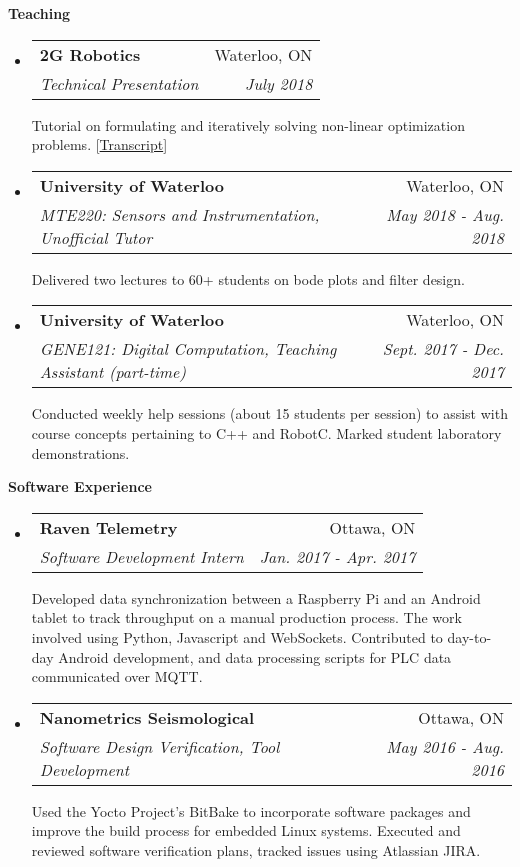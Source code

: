 \documentclass[letterpaper,11pt]{article}
\makeatletter
\newcommand{\resheading}[1]{{\large \colorbox{mygrey}{\begin{minipage}{\textwidth}{\textbf{#1 \vphantom{p\^{E}}}}\end{minipage}}}}
\newcommand{\ressubheading}[4]{
\begin{tabular*}{7.0in}{l@{\extracolsep{\fill}}r}
		\textbf{#1} & #2 \\
		\textit{#3} & \textit{#4} \\
\end{tabular*}\vspace{-6pt}}
\makeatother
\begin{document}
\resheading{Teaching}

\begin{itemize}
\item
	\ressubheading{2G Robotics}{Waterloo, ON}{Technical Presentation}{July 2018}
	\newline \newline
	Tutorial on formulating and iteratively solving non-linear optimization problems. [\href{https://github.com/ciccatrix/docs/blob/master/2018_07-2G_Optimization_Presentation/tech%20talk%20-%20optimization.pdf}{Transcript}]
	
\item
	\ressubheading{University of Waterloo}{Waterloo, ON}{MTE220: Sensors and Instrumentation, Unofficial Tutor}{May 2018 - Aug. 2018}
	\newline \newline
	Delivered two lectures to 60+ students on bode plots and filter design.

\item
	\ressubheading{University of Waterloo}{Waterloo, ON}{GENE121: Digital Computation, Teaching Assistant (part-time)}{Sept. 2017 - Dec. 2017}
	\newline \newline
	Conducted weekly help sessions (about 15 students per session) to assist with course concepts pertaining to C++ and RobotC. Marked student laboratory demonstrations.
\end{itemize}

\resheading{Software Experience}
\begin{itemize}

\item
	\ressubheading{Raven Telemetry}{Ottawa, ON}{Software Development Intern}{Jan. 2017 - Apr. 2017}
	\newline \newline
Developed data synchronization between a Raspberry Pi and an Android tablet to track throughput on a manual production process. The work involved using Python, Javascript and WebSockets. Contributed to day-to-day Android development, and data processing scripts for PLC data communicated over MQTT.
	
\item
	\ressubheading{Nanometrics Seismological}{Ottawa, ON}{Software Design Verification, Tool Development}{May 2016 - Aug. 2016}
\newline \newline
Used the Yocto Project's BitBake to incorporate software packages and improve the build process for embedded Linux systems. Executed and reviewed software verification plans, tracked issues using Atlassian JIRA.

\end{itemize}
\end{document}

